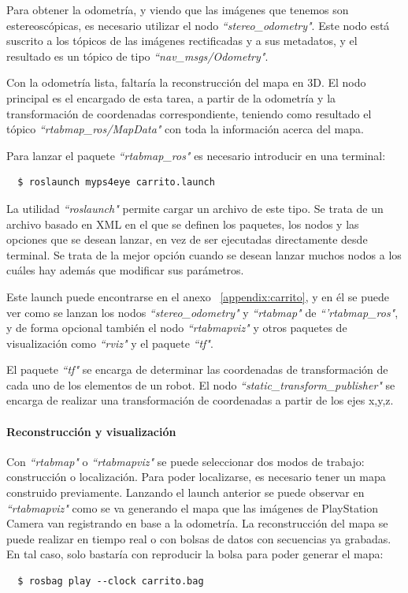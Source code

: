 Para obtener la odometría, y viendo que las imágenes que tenemos son
estereoscópicas, es necesario utilizar el nodo \textit{``stereo\_odometry"}.
Este nodo está suscrito a los tópicos de las imágenes rectificadas y a sus
metadatos, y el resultado es un tópico de tipo \textit{``nav\_msgs/Odometry"}.

Con la odometría lista, faltaría la reconstrucción del mapa en 3D. El nodo
principal es el encargado de esta tarea, a partir de la odometría y la
transformación de coordenadas correspondiente, teniendo como resultado el tópico
\textit{``rtabmap\_ros/MapData"} con toda la información acerca del mapa.

Para lanzar el paquete \textit{``rtabmap\_ros"} es necesario introducir en una
terminal:
\\
\begin{lstlisting}
  $ roslaunch myps4eye carrito.launch
\end{lstlisting}

La utilidad \textit{``roslaunch"} permite cargar un archivo de este tipo. Se
trata de un archivo basado en XML en el que se definen los paquetes, los nodos y
las opciones que se desean lanzar, en vez de ser ejecutadas directamente desde
terminal. Se trata de la mejor opción cuando se desean lanzar muchos nodos a los
cuáles hay además que modificar sus parámetros.

Este launch puede encontrarse en el anexo ~\ref{appendix:carrito}, y en él se
puede ver como se lanzan los nodos \textit{``stereo\_odometry"} y
\textit{``rtabmap"} de \textit{``'rtabmap\_ros"}, y de forma opcional también el
nodo \textit{``rtabmapviz"} y otros paquetes de visualización como
\textit{``rviz"} y el paquete \textit{``tf"}.

El paquete \textit{``tf"} \cite{PackageTf}se encarga de determinar las
coordenadas de transformación de cada uno de los elementos de un robot. El nodo
\textit{``static\_transform\_publisher"} se encarga de realizar una
transformación de coordenadas a partir de los ejes x,y,z.

\paragraph{Reconstrucción y visualización} \hspace{0pt}

Con \textit{``rtabmap"} o \textit{``rtabmapviz"} se puede seleccionar dos modos
de trabajo: construcción o localización. Para poder localizarse, es necesario
tener un mapa construido previamente. Lanzando el launch anterior se puede
observar en \textit{``rtabmapviz"} como se va generando el mapa que las imágenes
de PlayStation Camera van registrando en base a la odometría. La reconstrucción
del mapa se puede realizar en tiempo real o con bolsas de datos con secuencias
ya grabadas. En tal caso, solo bastaría con reproducir la bolsa para poder
generar el mapa:
\\
\begin{lstlisting}
  $ rosbag play --clock carrito.bag
\end{lstlisting}

